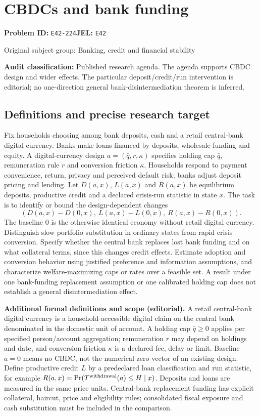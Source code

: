 \documentclass[11pt,a4paper]{article}
\begin{document}
\section*{CBDCs and bank funding}
\textbf{Problem ID:} \texttt{E42-224}\quad \textbf{JEL:} \texttt{E42}\par
\label{problem:OP-0329}
{\sffamily\small\color{muted}Original subject group: Banking, credit and financial stability\par}
\label{definitions:problem:30007611}
\textbf{Audit classification:} Published research agenda. The agenda supports CBDC design and wider effects. The particular deposit/credit/run intervention is editorial; no one-direction general bank-disintermediation theorem is inferred.
\subsection*{Definitions and precise research target}
Fix households choosing among bank deposits, cash and a retail central-bank digital currency. Banks make loans financed by deposits, wholesale funding and equity. A digital-currency design \(a=(\bar q,r,\kappa)\) specifies holding cap \(\bar q\), remuneration rule \(r\) and conversion friction \(\kappa\). Households respond to payment convenience, return, privacy and perceived default risk; banks adjust deposit pricing and lending. Let \(D(a,x)\), \(L(a,x)\) and \(R(a,x)\) be equilibrium deposits, productive credit and a declared crisis-run statistic in state \(x\). The task is to identify or bound the design-dependent changes
\[(D(a,x)-D(0,x),\ L(a,x)-L(0,x),\ R(a,x)-R(0,x)).\]
The baseline \(0\) is the otherwise identical economy without retail digital currency. Distinguish slow portfolio substitution in ordinary states from rapid crisis conversion. Specify whether the central bank replaces lost bank funding and on what collateral terms, since this changes credit effects. Estimate adoption and conversion behavior using justified preference and information assumptions, and characterize welfare-maximizing caps or rates over a feasible set. A result under one bank-funding replacement assumption or one calibrated holding cap does not establish a general disintermediation effect.

\textbf{Additional formal definitions and scope (editorial).} A retail central-bank digital currency is a household-accessible digital claim on the central bank denominated in the domestic unit of account. A holding cap \(\bar q\geq0\) applies per specified person/account aggregation; remuneration \(r\) may depend on holdings and date, and conversion friction \(\kappa\) is a declared fee, delay or limit. Baseline \(a=0\) means no CBDC, not the numerical zero vector of an existing design. Define productive credit \(L\) by a predeclared loan classification and run statistic, for example \(R(a,x)=\Pr(T^{\rm withdrawal}(a)\leq H\mid x)\). Deposits and loans are measured in the same price units. Central-bank replacement funding has explicit collateral, haircut, price and eligibility rules; consolidated fiscal exposure and cash substitution must be included in the comparison.
\end{document}
